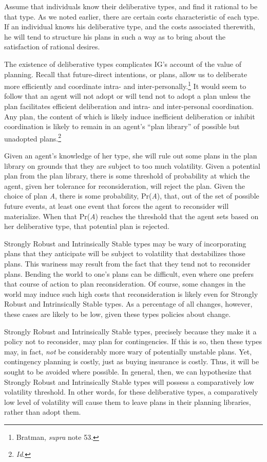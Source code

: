 Assume that individuals know their deliberative types, and find it
rational to be that type. As we noted earlier, there are certain costs
characteristic of each type. If an individual knows his deliberative
type, and the costs associated therewith, he will tend to structure his
plans in such a way as to bring about the satisfaction of rational
desires.

The existence of deliberative types complicates IG's account of the
value of planning. Recall that future-direct intentions, or plans, allow
us to deliberate more efficiently and coordinate intra- and
inter-personally.\footnote{Bratman, \emph{supra} note 53.} It would seem
to follow that an agent will not adopt or will tend not to adopt a plan
unless the plan facilitates efficient deliberation and intra- and
inter-personal coordination. Any plan, the content of which is likely
induce inefficient deliberation or inhibit coordination is likely to
remain in an agent's ``plan library'' of possible but unadopted
plans.\footnote{\emph{Id}.}

Given an agent's knowledge of her type, she will rule out some plans in
the plan library on grounds that they are subject to too much
volatility. Given a potential plan from the plan library, there is some
threshold of probability at which the agent, given her tolerance for
reconsideration, will reject the plan. Given the choice of plan
\emph{A}, there is some probability, Pr(\emph{A}), that, out of the set
of possible future events, at least one event that forces the agent to
reconsider will materialize. When that Pr(\emph{A}) reaches the
threshold that the agent sets based on her deliberative type, that
potential plan is rejected.

Strongly Robust and Intrinsically Stable types may be wary of
incorporating plans that they anticipate will be subject to volatility
that destabilizes those plans. This wariness may result from the fact
that they tend not to reconsider plans. Bending the world to one's plans
can be difficult, even where one prefers that course of action to plan
reconsideration. Of course, some changes in the world may induce such
high costs that reconsideration is likely even for Strongly Robust and
Intrinsically Stable types. As a percentage of all changes, however,
these cases are likely to be low, given these types policies about
change.

Strongly Robust and Intrinsically Stable types, precisely because they
make it a policy not to reconsider, may plan for contingencies. If this
is so, then these types may, in fact, \emph{not} be considerably more
wary of potentially unstable plans. Yet, contingency planning is costly,
just as buying insurance is costly. Thus, it will be sought to be
avoided where possible. In general, then, we can hypothesize that
Strongly Robust and Intrinsically Stable types will possess a
comparatively low volatility threshold. In other words, for these
deliberative types, a comparatively low level of volatility will cause
them to leave plans in their planning libraries, rather than adopt them.

